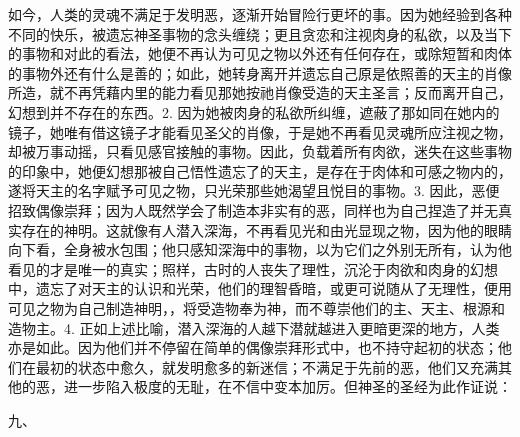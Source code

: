 如今，人类的灵魂不满足于发明恶，逐渐开始冒险行更坏的事。因为她经验到各种不同的快乐，被遗忘神圣事物的念头缠绕；更且贪恋和注视肉身的私欲，以及当下的事物和对此的看法，她便不再认为可见之物以外还有任何存在，或除短暂和肉体的事物外还有什么是善的；如此，她转身离开并遗忘自己原是依照善的天主的肖像所造，就不再凭藉内里的能力看见那她按祂肖像受造的天主圣言；反而离开自己，幻想到并不存在的东西。2. 因为她被肉身的私欲所纠缠，遮蔽了那如同在她内的镜子，她唯有借这镜子才能看见圣父的肖像，于是她不再看见灵魂所应注视之物，却被万事动摇，只看见感官接触的事物。因此，负载着所有肉欲，迷失在这些事物的印象中，她便幻想那被自己悟性遗忘了的天主，是存在于肉体和可感之物内的，遂将天主的名字赋予可见之物，只光荣那些她渴望且悦目的事物。3. 因此，恶便招致偶像崇拜；因为人既然学会了制造本非实有的恶，同样也为自己捏造了并无真实存在的神明。这就像有人潜入深海，不再看见光和由光显现之物，因为他的眼睛向下看，全身被水包围；他只感知深海中的事物，以为它们之外别无所有，认为他看见的才是唯一的真实；照样，古时的人丧失了理性，沉沦于肉欲和肉身的幻想中，遗忘了对天主的认识和光荣，他们的理智昏暗，或更可说随从了无理性，便用可见之物为自己制造神明，，将受造物奉为神，而不尊崇他们的主、天主、根源和造物主。4. 正如上述比喻，潜入深海的人越下潜就越进入更暗更深的地方，人类亦是如此。因为他们并不停留在简单的偶像崇拜形式中，也不持守起初的状态；他们在最初的状态中愈久，就发明愈多的新迷信；不满足于先前的恶，他们又充满其他的恶，进一步陷入极度的无耻，在不信中变本加厉。但神圣的圣经为此作证说：\par

九、\par

